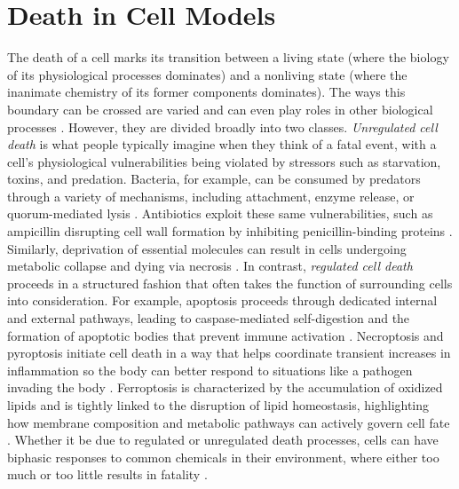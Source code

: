 \documentclass{article}
\begin{document}
\section{Death in Cell Models}

The death of a cell marks its transition between a living state (where the biology of its physiological processes dominates) and a nonliving state (where the inanimate chemistry of its former components dominates). The ways this boundary can be crossed are varied and can even play roles in other biological processes \cite{ghose_cell_2020}. However, they are divided broadly into two classes. \textit{Unregulated cell death} is what people typically imagine when they think of a fatal event, with a cell’s physiological vulnerabilities being violated by stressors such as starvation, toxins, and predation. Bacteria, for example, can be consumed by predators through a variety of mechanisms, including attachment, enzyme release, or quorum-mediated lysis \cite{perez_bacterial_2016}. Antibiotics exploit these same vulnerabilities, such as ampicillin disrupting cell wall formation by inhibiting penicillin-binding proteins \cite{cho_beta-lactam_2014, wong_understanding_2021}. Similarly, deprivation of essential molecules can result in cells undergoing metabolic collapse and dying via necrosis \cite{barros_necrotic_2001}. In contrast, \textit{regulated cell death} proceeds in a structured fashion that often takes the function of surrounding cells into consideration. For example, apoptosis proceeds through dedicated internal and external pathways, leading to caspase-mediated self-digestion and the formation of apoptotic bodies that prevent immune activation \cite{elmore_apoptosis_2007}. Necroptosis and pyroptosis initiate cell death in a way that helps coordinate transient increases in inflammation so the body can better respond to situations like a pathogen invading the body \cite{bergsbaken_pyroptosis_2009, pasparakis_necroptosis_2015}. Ferroptosis is characterized by the accumulation of oxidized lipids and is tightly linked to the disruption of lipid homeostasis, highlighting how membrane composition and metabolic pathways can actively govern cell fate \cite{agmon_lipid_2017}. Whether it be due to regulated or unregulated death processes, cells can have biphasic responses to common chemicals in their environment, where either too much or too little results in fatality \cite{karin_biphasic_2017}.
\end{document}
